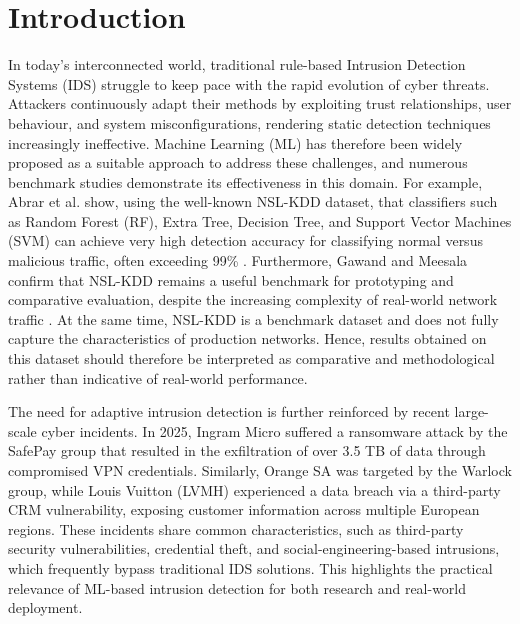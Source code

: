 \chapter{Introduction}
\label{cha:intro}

In today’s interconnected world, traditional rule-based Intrusion Detection Systems (IDS) struggle to keep pace with the rapid evolution of cyber threats. Attackers continuously adapt their methods by exploiting trust relationships, user behaviour, and system misconfigurations, rendering static detection techniques increasingly ineffective. Machine Learning (ML) has therefore been widely proposed as a suitable approach to address these challenges, and numerous benchmark studies demonstrate its effectiveness in this domain. For example, Abrar et al. show, using the well-known NSL-KDD dataset, that classifiers such as Random Forest (RF), Extra Tree, Decision Tree, and Support Vector Machines (SVM) can achieve very high detection accuracy for classifying normal versus malicious traffic, often exceeding 99\% \cite{abrar2020machine}. Furthermore, Gawand and Meesala confirm that NSL-KDD remains a useful benchmark for prototyping and comparative evaluation, despite the increasing complexity of real-world network traffic \cite{gawand2025improved}. At the same time, NSL-KDD is a benchmark dataset and does not fully capture the characteristics of production networks. Hence, results obtained on this dataset should therefore be interpreted as comparative and methodological rather than indicative of real-world performance.

The need for adaptive intrusion detection is further reinforced by recent large-scale cyber incidents. In 2025, Ingram Micro suffered a ransomware attack by the SafePay group that resulted in the exfiltration of over 3.5 TB of data through compromised VPN credentials. Similarly, Orange SA was targeted by the Warlock group, while Louis Vuitton (LVMH) experienced a data breach via a third-party CRM vulnerability, exposing customer information across multiple European regions. These incidents share common characteristics, such as third-party security vulnerabilities, credential theft, and social-engineering-based intrusions, which frequently bypass traditional IDS solutions\cite{pkware2024breaches}. This highlights the practical relevance of ML-based intrusion detection for both research and real-world deployment.

